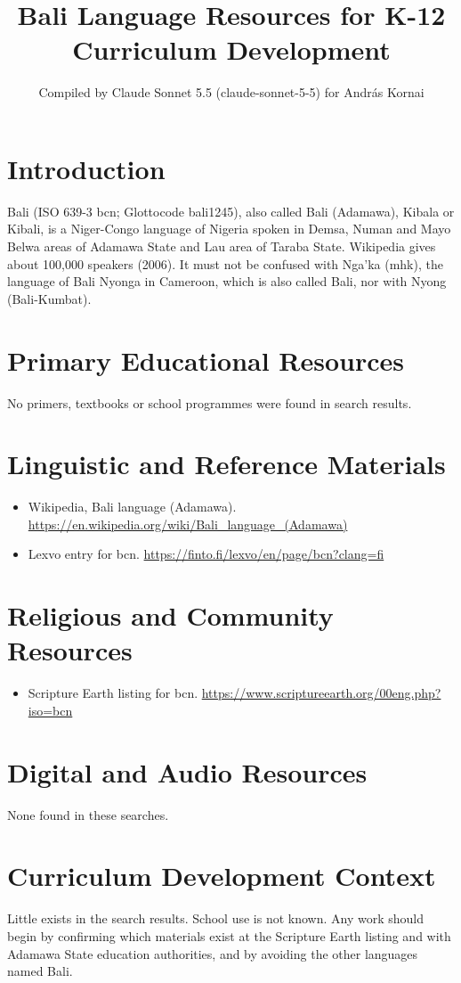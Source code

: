 \documentclass[12pt]{article}
\title{Bali Language Resources for K-12 Curriculum Development}
\author{Compiled by Claude Sonnet 5.5 (claude-sonnet-5-5) for Andr\'as Kornai}
\date{}
\begin{document}
\maketitle

\section{Introduction}
Bali (ISO 639-3 bcn; Glottocode bali1245), also called Bali (Adamawa), Kibala or Kibali, is a Niger-Congo language of Nigeria spoken in Demsa, Numan and Mayo Belwa areas of Adamawa State and Lau area of Taraba State. Wikipedia gives about 100,000 speakers (2006). It must not be confused with Nga'ka (mhk), the language of Bali Nyonga in Cameroon, which is also called Bali, nor with Nyong (Bali-Kumbat).

\section{Primary Educational Resources}
No primers, textbooks or school programmes were found in search results.

\section{Linguistic and Reference Materials}
\begin{itemize}
\item Wikipedia, Bali language (Adamawa). \url{https://en.wikipedia.org/wiki/Bali_language_(Adamawa)}
\item Lexvo entry for bcn. \url{https://finto.fi/lexvo/en/page/bcn?clang=fi}
\end{itemize}

\section{Religious and Community Resources}
\begin{itemize}
\item Scripture Earth listing for bcn. \url{https://www.scriptureearth.org/00eng.php?iso=bcn}
\end{itemize}

\section{Digital and Audio Resources}
None found in these searches.

\section{Curriculum Development Context}
Little exists in the search results. School use is not known. Any work should begin by confirming which materials exist at the Scripture Earth listing and with Adamawa State education authorities, and by avoiding the other languages named Bali.
\end{document}
